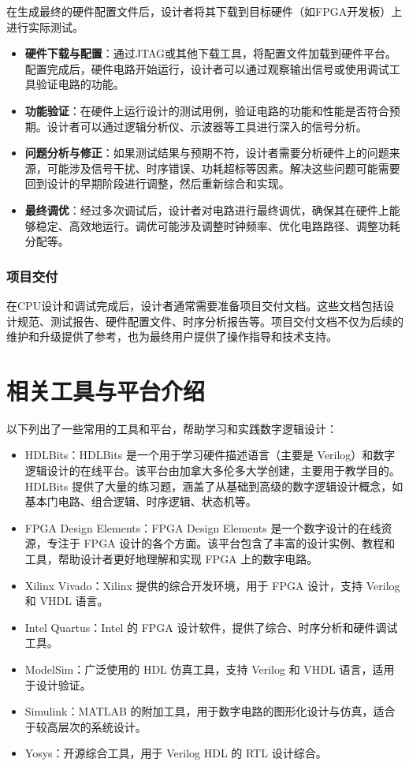 在生成最终的硬件配置文件后，设计者将其下载到目标硬件（如FPGA开发板）上进行实际测试。

\begin{itemize}
\tightlist
\item
  \textbf{硬件下载与配置}：通过JTAG或其他下载工具，将配置文件加载到硬件平台。配置完成后，硬件电路开始运行，设计者可以通过观察输出信号或使用调试工具验证电路的功能。
\item
  \textbf{功能验证}：在硬件上运行设计的测试用例，验证电路的功能和性能是否符合预期。设计者可以通过逻辑分析仪、示波器等工具进行深入的信号分析。
\item
  \textbf{问题分析与修正}：如果测试结果与预期不符，设计者需要分析硬件上的问题来源，可能涉及信号干扰、时序错误、功耗超标等因素。解决这些问题可能需要回到设计的早期阶段进行调整，然后重新综合和实现。
\item
  \textbf{最终调优}：经过多次调试后，设计者对电路进行最终调优，确保其在硬件上能够稳定、高效地运行。调优可能涉及调整时钟频率、优化电路路径、调整功耗分配等。
\end{itemize}

\subsubsection{项目交付}\label{sec:03-digital-logic-032}

在CPU设计和调试完成后，设计者通常需要准备项目交付文档。这些文档包括设计规范、测试报告、硬件配置文件、时序分析报告等。项目交付文档不仅为后续的维护和升级提供了参考，也为最终用户提供了操作指导和技术支持。

\section{相关工具与平台介绍}\label{sec:03-digital-logic-033}

以下列出了一些常用的工具和平台，帮助学习和实践数字逻辑设计：

\begin{itemize}
\item
  HDLBits：HDLBits 是一个用于学习硬件描述语言（主要是 Verilog）和数字逻辑设计的在线平台。该平台由加拿大多伦多大学创建，主要用于教学目的。HDLBits 提供了大量的练习题，涵盖了从基础到高级的数字逻辑设计概念，如基本门电路、组合逻辑、时序逻辑、状态机等。
\item
  FPGA Design Elements：FPGA Design Elements 是一个数字设计的在线资源，专注于 FPGA 设计的各个方面。该平台包含了丰富的设计实例、教程和工具，帮助设计者更好地理解和实现 FPGA 上的数字电路。
\item
  Xilinx Vivado：Xilinx 提供的综合开发环境，用于 FPGA 设计，支持 Verilog 和 VHDL 语言。
\item
  Intel Quartus：Intel 的 FPGA 设计软件，提供了综合、时序分析和硬件调试工具。
\item
  ModelSim：广泛使用的 HDL 仿真工具，支持 Verilog 和 VHDL 语言，适用于设计验证。
\item
  Simulink：MATLAB 的附加工具，用于数字电路的图形化设计与仿真，适合于较高层次的系统设计。
\item
  Yosys：开源综合工具，用于 Verilog HDL 的 RTL 设计综合。
\end{itemize}

